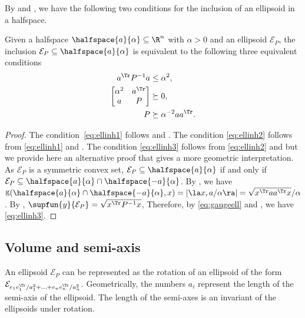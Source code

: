 \documentclass[11pt,twoside,a4paper,openright]{uclouvain-thesis}
\DeclareMathOperator{\gauge}{g}
\begin{document}
By  and , we have
the following two conditions for the inclusion of an ellipsoid
in a halfspace.
\begin{myprop}
  \label{prop:ellinh}
  Given a halfspace $\halfspace{a}{\alpha} \subseteq \R^n$ with $\alpha > 0$ and an ellipsoid $\mathcal{E}_P$,
  the inclusion $\mathcal{E}_P \subseteq \halfspace{a}{\alpha}$ is equivalent to the following three equivalent conditions
  \begin{align}
    \label{eq:ellinh1}
    a^\Tr P^{-1} a & \le \alpha^2,\\
    \label{eq:ellinh2}
    \begin{bmatrix}
      \alpha^2 & a^\Tr\\
      a & P
    \end{bmatrix}
    & \succeq 0,\\
    \label{eq:ellinh3}
    P & \succeq \alpha^{-2} aa^\Tr.
  \end{align}
  \begin{proof}
    The condition~\eqref{eq:ellinh1} follows  and .
    The condition \eqref{eq:ellinh2} follows from \eqref{eq:ellinh1} and .
    The condition \eqref{eq:ellinh3} follows from \eqref{eq:ellinh2} and  but we provide here an alternative proof
    that gives a more geometric interpretation.
    As $\mathcal{E}_P$ is a symmetric convex set, $\mathcal{E}_P \subseteq \halfspace{a}{\alpha}$
    if and only if $\mathcal{E}_P \subseteq \halfspace{a}{\alpha} \cap \halfspace{-a}{\alpha}$.
    By , we have $\gauge(\halfspace{a}{\alpha} \cap \halfspace{-a}{\alpha}, x) = |\la x, a/\alpha \ra| = \sqrt{x^\Tr a a^\Tr x} / \alpha$.
    By , $\supfun{y}{\mathcal{E}_P} = \sqrt{x^\Tr P^{-1} x}$,
    Therefore, by \eqref{eq:gaugeell} and , we have \eqref{eq:ellinh3}.
  \end{proof}
\end{myprop}

\subsection{Volume and semi-axis}

An ellipsoid $\mathcal{E}_P$ can be represented as the rotation of
an ellipsoid of the form $\mathcal{E}_{e_1e_1^\Tr / a_1^2 + \ldots + e_ne_n^\Tr / a_n^2}$.
Geometrically, the numbers $a_i$ represent the length of the semi-axis of the ellipsoid.
The length of the semi-axes is an invariant of the ellipsoids under rotation.
\end{document}
